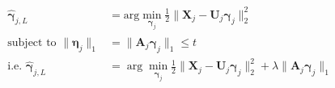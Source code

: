 \documentclass[11pt]{article}
\newcommand{\R}{\mathbb R}
\newcommand{\bX}{\mathbf X}
\newcommand{\bA}{\mathbf A}
\newcommand{\bM}{\mathbf M}
\newcommand{\bI}{\mathbf I}
\newcommand{\bU}{\mathbf U}
\newcommand{\bseta}{\boldsymbol{\eta}}
\newcommand{\bgamma}{\boldsymbol{\gamma}}
\begin{document}


\begin{equation}
    \label{eq:glars}
    \begin{aligned}
    \hat{\bgamma}_{j,L} &= \text{arg} \min_{\substack{\bgamma_j}} \frac{1}{2}\|\bX_j - \bU_j \bgamma_j\|_2^2 \\
    \text{subject to } \|\bseta_j\|_1 &= \|\bA_j \bgamma_j\|_1 \leq t\\
    \text{i.e. }\hat{\bgamma}_{j,L} &= \arg\min_{\substack{\bgamma_j}} \frac{1}{2}\|\bX_j - \bU_j \bgamma_j\|_2^2 + \lambda \|\bA_j \bgamma_j\|_1\\
    \end{aligned}
\end{equation}
\end{document}
